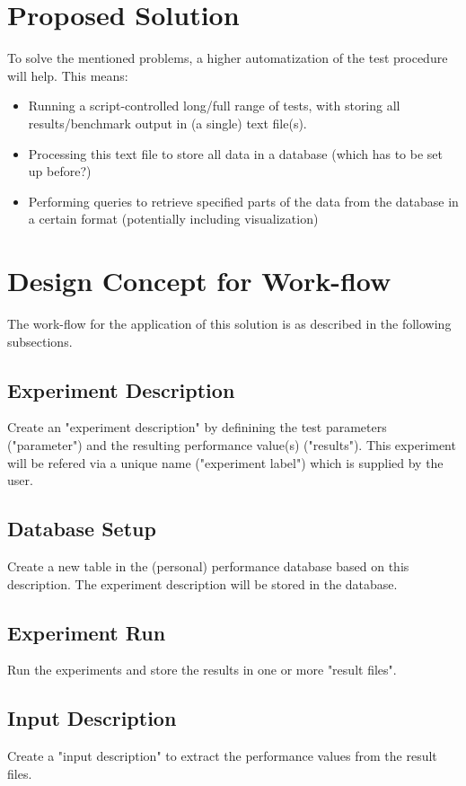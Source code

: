 \documentclass[12pt,a4paper]{article}
\begin{document}
\section{Proposed Solution}
To solve the mentioned problems, a higher automatization of
the test procedure will help. This means:
\begin{itemize}
\item Running a script-controlled long/full range of tests, with storing 
  all results/benchmark output in (a single) text file(s).
\item Processing this text file to store all data in a database (which
  has to be set up before?)
\item Performing queries to retrieve specified parts of the data from the 
  database in a certain format (potentially including visualization)
\end{itemize}


\section{Design Concept for Work-flow}
\label{sec:work-flow}
The work-flow for the application of this solution is as described in the following subsections.
\subsection{Experiment Description}

\label{sec:exp-desc}
Create an "experiment description" by definining the test parameters 
("parameter") and the resulting performance value(s) ("results"). 
This experiment will be refered via a unique name ("experiment label")
which is supplied by the user.

\subsection{Database Setup}
\label{sec:db-setup}
Create a new table in the (personal) performance database based on
this description. The experiment description will be stored in the
database.

\subsection{Experiment Run}
\label{sec:exp-run}
Run the experiments and store the results in one or more "result files".

\subsection{Input Description}
\label{sec:inp-desc}
Create a "input description" to extract the performance values from
the result files. 
\end{document}
